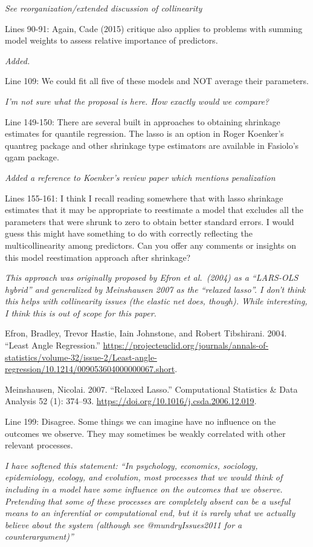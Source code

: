 \documentclass[12pt]{article}
\begin{document}
\emph{See reorganization/extended discussion of collinearity}

Lines 90-91: Again, Cade (2015) critique also applies to problems with
summing model weights to assess relative importance of predictors.

\emph{Added.}

Line 109: We could ﬁt all ﬁve of these models and NOT average their
parameters.

\emph{I'm not sure what the proposal is here. How exactly would we
compare?}

Line 149-150: There are several built in approaches to obtaining
shrinkage estimates for quantile regression. The lasso is an option in
Roger Koenker's quantreg package and other shrinkage type estimators are
available in Fasiolo's qgam package.

\emph{Added a reference to Koenker's review paper which mentions
penalization}

Lines 155-161: I think I recall reading somewhere that with lasso
shrinkage estimates that it may be appropriate to reestimate a model
that excludes all the parameters that were shrunk to zero to obtain
better standard errors. I would guess this might have something to do
with correctly reﬂecting the multicollinearity among predictors. Can you
oﬀer any comments or insights on this model reestimation approach after
shrinkage?

{\em This approach was originally proposed by Efron et al.~(2004) as a
``LARS-OLS hybrid'' and generalized by Meinshausen 2007 as the ``relaxed
lasso''. I don't think this helps with collinearity issues (the elastic
net does, though). While interesting, I think this is out of scope for
this paper.

Efron, Bradley, Trevor Hastie, Iain Johnstone, and Robert Tibshirani.
2004. ``Least Angle Regression.''
\url{https://projecteuclid.org/journals/annals-of-statistics/volume-32/issue-2/Least-angle-regression/10.1214/009053604000000067.short}.

Meinshausen, Nicolai. 2007. ``Relaxed Lasso.'' Computational Statistics
\& Data Analysis 52 (1): 374--93.
\url{https://doi.org/10.1016/j.csda.2006.12.019}.
}

Line 199: Disagree. Some things we can imagine have no inﬂuence on the
outcomes we observe. They may sometimes be weakly correlated with other
relevant processes.

\emph{I have softened this statement: ``In psychology, economics,
sociology, epidemiology, ecology, and evolution, most processes that we
would think of including in a model have \emph{some} influence on the
outcomes that we observe. Pretending that some of these processes are
completely absent can be a useful means to an inferential or
computational end, but it is rarely what we actually believe about the
system (although see @mundryIssues2011 for a counterargument)''}
\end{document}
